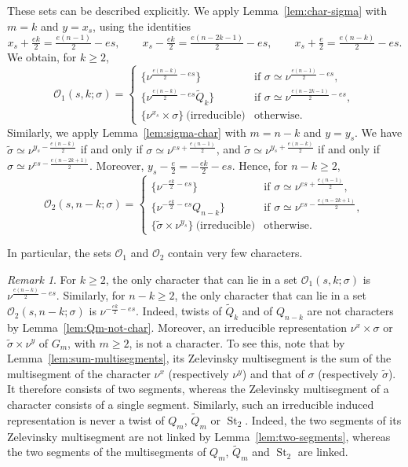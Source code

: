 \documentclass[11pt]{amsart}
\numberwithin{equation}{section}
\theoremstyle{plain}
\theoremstyle{definition}
\theoremstyle{remark}
\newtheorem{remark}[theorem]{Remark}
\DeclareMathOperator{\St}{St}
\newcommand{\Qt}{\widetilde{Q}}
\begin{document}
These sets can be described explicitly. We apply Lemma~\ref{lem:char-sigma} with $m=k$ and $y=x_s$, using the identities
$$x_s+\tfrac{ek}2=\tfrac{e(n-1)}2-es,\qquad x_s-\tfrac{ek}2=\tfrac{e(n-2k-1)}2-es,\qquad x_s+\tfrac e2=\tfrac{e(n-k)}2-es.$$
We obtain, for $k\ge2$,
\begin{equation}\label{eq:O1}
	\mathcal O_1(s,k;\sigma)=\begin{cases}\{\nu^{\frac{e(n-k)}2-es}\}&\text{if }\sigma\simeq\nu^{\frac{e(n-1)}2-es},\\[2pt] \{\nu^{\frac{e(n-k)}2-es}\Qt_k\}&\text{if }\sigma\simeq\nu^{\frac{e(n-2k-1)}2-es},\\[2pt] \{\nu^{x_s}\times\sigma\}\ \text{(irreducible)}&\text{otherwise.}\end{cases}
\end{equation}
Similarly, we apply Lemma~\ref{lem:sigma-char} with $m=n-k$ and $y=y_s$. We have $\widetilde\sigma\simeq\nu^{y_s-\frac{e(n-k)}2}$ if and only if $\sigma\simeq\nu^{es+\frac{e(n-1)}2}$, and $\widetilde\sigma\simeq\nu^{y_s+\frac{e(n-k)}2}$ if and only if $\sigma\simeq\nu^{es-\frac{e(n-2k+1)}2}$. Moreover, $y_s-\frac e2=-\frac{ek}2-es$. Hence, for $n-k\ge2$,
\begin{equation}\label{eq:O2}
	\mathcal O_2(s,n-k;\sigma)=\begin{cases}\{\nu^{-\frac{ek}2-es}\}&\text{if }\sigma\simeq\nu^{es+\frac{e(n-1)}2},\\[2pt] \{\nu^{-\frac{ek}2-es}Q_{n-k}\}&\text{if }\sigma\simeq\nu^{es-\frac{e(n-2k+1)}2},\\[2pt] \{\widetilde\sigma\times\nu^{y_s}\}\ \text{(irreducible)}&\text{otherwise.}\end{cases}
\end{equation}

In particular, the sets $\mathcal O_1$ and $\mathcal O_2$ contain very few characters.

\begin{remark}\label{rem:O-characters}
	For $k\ge2$, the only character that can lie in a set $\mathcal O_1(s,k;\sigma)$ is $\nu^{\frac{e(n-k)}2-es}$. Similarly, for $n-k\ge2$, the only character that can lie in a set $\mathcal O_2(s,n-k;\sigma)$ is $\nu^{-\frac{ek}2-es}$. Indeed, twists of $\Qt_k$ and of $Q_{n-k}$ are not characters by Lemma~\ref{lem:Qm-not-char}. Moreover, an irreducible representation $\nu^{x}\times\sigma$ or $\widetilde\sigma\times\nu^y$ of $G_m$, with $m\ge2$, is not a character. To see this, note that by Lemma~\ref{lem:sum-multisegments}, its Zelevinsky multisegment is the sum of the multisegment of the character $\nu^x$ (respectively $\nu^y$) and that of $\sigma$ (respectively $\widetilde\sigma$). It therefore consists of two segments, whereas the Zelevinsky multisegment of a character consists of a single segment. Similarly, such an irreducible induced representation is never a twist of $Q_m$, $\Qt_m$ or $\St_2$. Indeed, the two segments of its Zelevinsky multisegment are not linked by Lemma~\ref{lem:two-segments}, whereas the two segments of the multisegments of $Q_m$, $\Qt_m$ and $\St_2$ are linked.
\end{remark}
\end{document}
